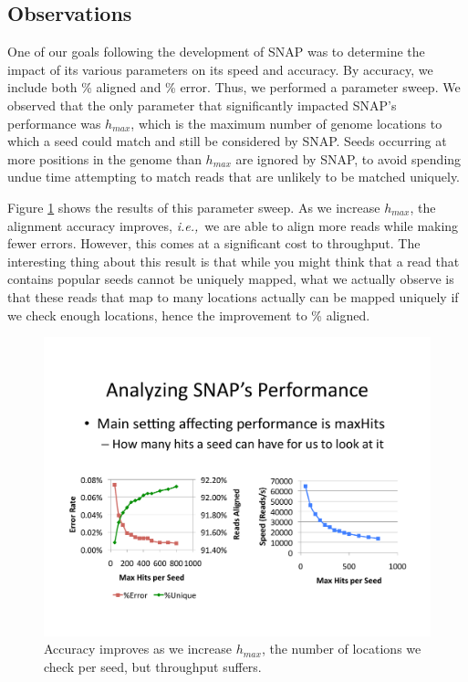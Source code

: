 \documentclass[twocolumn,10pt]{article}
\newcommand{\ie}{{\em i.e.,}~}
\begin{document}
\subsection{Observations}

One of our goals following the development of SNAP was to determine the impact of its various parameters on its speed and accuracy.  By accuracy, we include both \% aligned and \% error.  Thus, we performed a parameter sweep.  We observed that the only parameter that significantly impacted SNAP's performance was \(h_{max}\), which is the maximum number of genome locations to which a seed could match and still be considered by SNAP.  Seeds occurring at more positions in the genome than \(h_{max}\) are ignored by SNAP, to avoid spending undue time attempting to match reads that are unlikely to be matched uniquely.

Figure \ref{fig:maxHits} shows the results of this parameter sweep.  As we increase \(h_{max}\), the alignment accuracy improves, \ie we are able to align more reads while making fewer errors.  However, this comes at a significant cost to throughput.  The interesting thing about this result is that while you might think that a read that contains popular seeds cannot be uniquely mapped, what we actually observe is that these reads that map to many locations actually can be mapped uniquely if we check enough locations, hence the improvement to \% aligned.

\begin{figure}[!t]
\centering
\includegraphics[scale=0.6]{maxHits.pdf}
\caption{Accuracy improves as we increase \(h_{max}\), the number of locations we check per seed, but throughput suffers.}
\label{fig:maxHits}
\end{figure}
\end{document}
